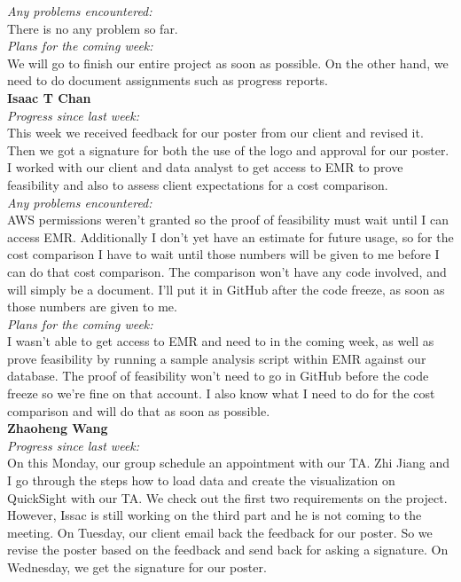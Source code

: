 \noindent\textit{Any problems encountered:}\\
There is no any problem so far.\\

\noindent\textit{Plans for the coming week:}\\
We will go to finish our entire project as soon as possible. On the other hand, we need to do document assignments such as progress reports.\\

\noindent\textbf{Isaac T Chan}\\
\noindent\textit{Progress since last week:}\\
This week we received feedback for our poster from our client and revised it. Then we got a signature for both the use of the logo and approval for our poster. I worked with our client and data analyst to get access to EMR to prove feasibility and also to assess client expectations for a cost comparison.\\

\noindent\textit{Any problems encountered:}\\
AWS permissions weren't granted so the proof of feasibility must wait until I can access EMR. Additionally I don't yet have an estimate for future usage, so for the cost comparison I have to wait until those numbers will be given to me before I can do that cost comparison. The comparison won't have any code involved, and will simply be a document. I'll put it in GitHub after the code freeze, as soon as those numbers are given to me.\\

\noindent\textit{Plans for the coming week:}\\
I wasn't able to get access to EMR and need to in the coming week, as well as prove feasibility by running a sample analysis script within EMR against our database. The proof of feasibility won't need to go in GitHub before the code freeze so we're fine on that account. I also know what I need to do for the cost comparison and will do that as soon as possible.\\

\noindent\textbf{Zhaoheng Wang}\\
\noindent\textit{Progress since last week:}\\
On this Monday, our group schedule an appointment with our TA. Zhi Jiang and I go through the steps how to load data and create the visualization on QuickSight with our TA. We check out the first two requirements on the project. However, Issac is still working on the third part and he is not coming to the meeting. On Tuesday, our client email back the feedback for our poster. So we revise the poster based on the feedback and send back for asking a signature. On Wednesday, we get the signature for our poster.\\

